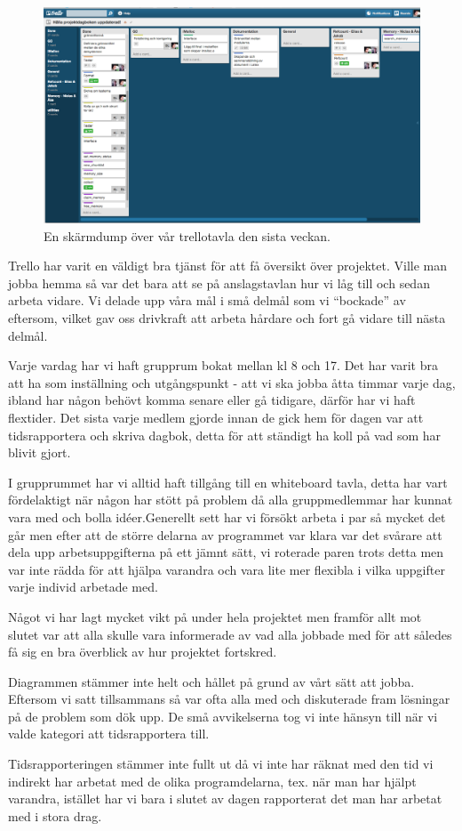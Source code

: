 \documentclass{article}
\begin{document}
\begin{figure}[H]
  \includegraphics[width=\columnwidth]{../bilder/trello.png}
  \caption{En skärmdump över vår trellotavla den sista veckan.}
  \label{fig:trello}
\end{figure}

Trello har varit en väldigt bra tjänst för att få översikt över projektet. Ville man jobba hemma så var det bara att se på anslagstavlan hur vi låg till och sedan arbeta vidare. Vi delade upp våra mål i små delmål som vi “bockade” av eftersom, vilket gav oss drivkraft att arbeta hårdare och fort gå vidare till nästa delmål.


Varje vardag har vi haft grupprum bokat mellan kl 8 och 17. Det har varit bra att ha som inställning och utgångspunkt - att vi ska jobba åtta timmar varje dag, ibland har någon behövt komma senare eller gå tidigare, därför har vi haft flextider. Det sista varje medlem gjorde innan de gick hem för dagen var att tidsrapportera och skriva dagbok, detta för att ständigt ha koll på vad som har blivit gjort.

I grupprummet har vi alltid haft tillgång till en whiteboard tavla, detta har vart fördelaktigt när någon har stött på problem då alla gruppmedlemmar har kunnat vara med och bolla idéer.Generellt sett har vi försökt arbeta i par så mycket det går men efter att de större delarna av programmet var klara var det svårare att dela upp arbetsuppgifterna på ett jämnt sätt, vi roterade paren trots detta men var inte rädda för att hjälpa varandra och vara lite mer flexibla i vilka uppgifter varje individ arbetade med. 

Något vi har lagt mycket vikt på under hela projektet men framför allt mot slutet var att alla skulle vara informerade av vad alla jobbade med för att således få sig en bra överblick av hur projektet fortskred. 

Diagrammen stämmer inte helt och hållet på grund av vårt sätt att jobba. Eftersom vi satt tillsammans så var ofta alla med och diskuterade fram lösningar på de problem som dök upp. De små avvikelserna tog vi inte hänsyn till när vi valde kategori att tidsrapportera till.

Tidsrapporteringen stämmer inte fullt ut då vi inte har räknat med den tid vi indirekt har arbetat med de olika programdelarna, tex. när man har hjälpt varandra, istället har vi bara i slutet av dagen rapporterat det man har arbetat med i stora drag.
\end{document}
